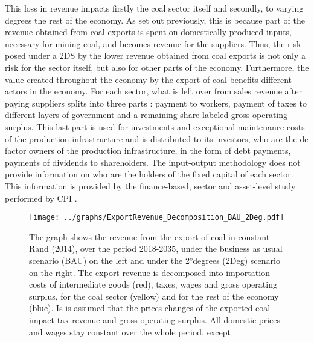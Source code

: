 \documentclass[12pt,english]{article}
\begin{document}
This loss in revenue impacts firstly the coal sector itself and secondly, to varying degrees the rest of the economy. As set out previously, this is because part of the revenue obtained from coal exports is spent on domestically produced inputs, necessary for mining coal, and becomes revenue for the suppliers. Thus, the risk posed under a 2DS by the lower revenue obtained from coal exports is not only a risk for the sector itself, but also for other parts of the economy. Furthermore, the value created throughout the economy by %
the export of coal benefits different actors in the economy. For each sector, what is left over from sales revenue after paying suppliers splits into three parts : payment to workers, payment of taxes to different layers of government and a remaining share labeled gross operating surplus. This last part is used for investments and exceptional maintenance costs of the production infrastructure and is distributed to its investors, who are the de factor owners of the production infrastructure, in the form of debt payments, payments of dividends to shareholders. %
The input-output methodology does not provide information on who are the holders of the fixed capital of each sector. This information is provided by the finance-based, sector and asset-level study performed by CPI \citep{CPI2019SA}. 

\begin{figure}[!b]
	\hspace{-10pt}\texttt{[image: ../graphs/ExportRevenue\_Decomposition\_BAU\_2Deg.pdf]}
	\caption{\label{ExportRevenue_Decomposition_Diff}\small The graph shows the revenue from the export of coal in constant Rand (2014), over the period 2018-2035, under the business as usual scenario (BAU) on the left and under the 2°degrees (2Deg) scenario on the right. The export revenue is decomposed into importation costs of intermediate goods (red), taxes, wages and gross operating surplus, for the coal sector (yellow) and for the rest of the economy (blue). Is is assumed that the prices changes of the exported coal impact tax revenue and gross operating surplus. All domestic prices and wages stay constant over the whole period, except  }
\end{figure}
\end{document}
